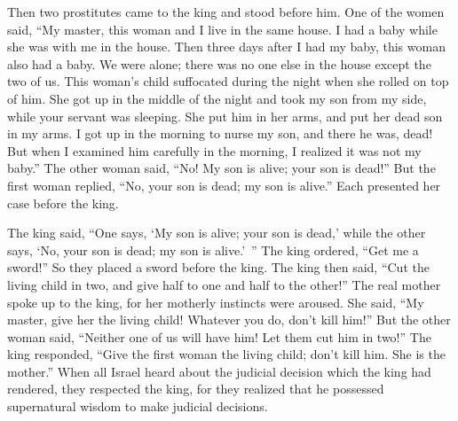 {\par }{\PP {}Then
two
prostitutes
came
to
the king
and stood
before him.
One
of the women
said,
“My master,
this
woman
and I
live
in the same
house.
I had a baby
while she was with
me in the house.
Then
three
days
after
I had my baby,
this
woman
also
had
a baby.
We
were alone;
there was no
one else
in the house
except
the two
of us.
This woman’s
child
suffocated
during the night
when she rolled
on top of him.
She got up
in the middle
of the night
and took
my son
from my side,
while your servant
was sleeping.
She put
him in her arms,
and put
her dead
son
in my arms.
I got
up in the morning
to nurse
my son,
and there
he was, dead! But when I examined him carefully
in the morning,
I realized
it
was not
my baby.”
The other
woman
said,
“No! My son
is alive;
your son
is dead!” But the first woman replied,
“No,
your son
is dead;
my son
is alive.”
Each presented her case
before
the king.
\par }{\PP {}The king
said, “One
says, ‘My son
is alive;
your son
is dead,’
while the other
says,
‘No,
your son
is dead;
my son
is alive.’ ”
The king
ordered,
“Get
me a sword!” So they placed
a sword
before
the king.
The king
then said,
“Cut
the living
child
in two,
and give
half
to one
and half
to the other!”
The real mother
spoke
up to
the king,
for
her motherly instincts
were aroused.
She said,
“My master,
give
her the living
child! Whatever you do, don’t
kill
him!” But the other
woman said,
“Neither one
of us will have him! Let them cut
him in two!”
The king
responded,
“Give
the first woman the living
child;
don’t
kill
him.
She
is the mother.”
When all
Israel
heard
about the judicial
decision
which
the king
had rendered, they respected
the king,
for
they realized
that
he possessed supernatural
wisdom
to make
judicial decisions.

}
